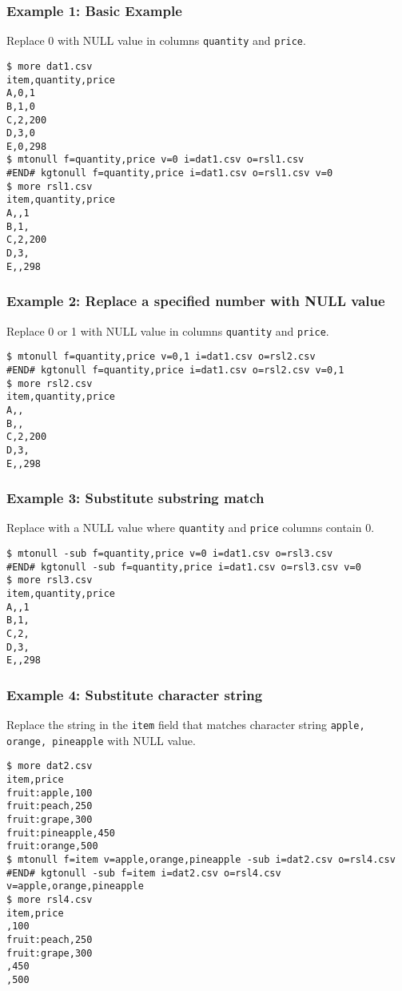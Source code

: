 \subsubsection*{Example 1: Basic Example}

Replace 0 with NULL value in columns \verb|quantity| and \verb|price|.


\begin{Verbatim}[baselinestretch=0.7,frame=single]
$ more dat1.csv
item,quantity,price
A,0,1
B,1,0
C,2,200
D,3,0
E,0,298
$ mtonull f=quantity,price v=0 i=dat1.csv o=rsl1.csv
#END# kgtonull f=quantity,price i=dat1.csv o=rsl1.csv v=0
$ more rsl1.csv
item,quantity,price
A,,1
B,1,
C,2,200
D,3,
E,,298
\end{Verbatim}
\subsubsection*{Example 2: Replace a specified number with NULL value}

Replace 0 or 1 with NULL value in columns \verb|quantity| and \verb|price|.


\begin{Verbatim}[baselinestretch=0.7,frame=single]
$ mtonull f=quantity,price v=0,1 i=dat1.csv o=rsl2.csv
#END# kgtonull f=quantity,price i=dat1.csv o=rsl2.csv v=0,1
$ more rsl2.csv
item,quantity,price
A,,
B,,
C,2,200
D,3,
E,,298
\end{Verbatim}
\subsubsection*{Example 3: Substitute substring match}

Replace with a NULL value where \verb|quantity| and \verb|price| columns contain 0.


\begin{Verbatim}[baselinestretch=0.7,frame=single]
$ mtonull -sub f=quantity,price v=0 i=dat1.csv o=rsl3.csv
#END# kgtonull -sub f=quantity,price i=dat1.csv o=rsl3.csv v=0
$ more rsl3.csv
item,quantity,price
A,,1
B,1,
C,2,
D,3,
E,,298
\end{Verbatim}
\subsubsection*{Example 4: Substitute character string}

Replace the string in the \verb|item| field that matches character string \verb|apple, orange, pineapple| with NULL value.


\begin{Verbatim}[baselinestretch=0.7,frame=single]
$ more dat2.csv
item,price
fruit:apple,100
fruit:peach,250
fruit:grape,300
fruit:pineapple,450
fruit:orange,500
$ mtonull f=item v=apple,orange,pineapple -sub i=dat2.csv o=rsl4.csv
#END# kgtonull -sub f=item i=dat2.csv o=rsl4.csv v=apple,orange,pineapple
$ more rsl4.csv
item,price
,100
fruit:peach,250
fruit:grape,300
,450
,500
\end{Verbatim}
